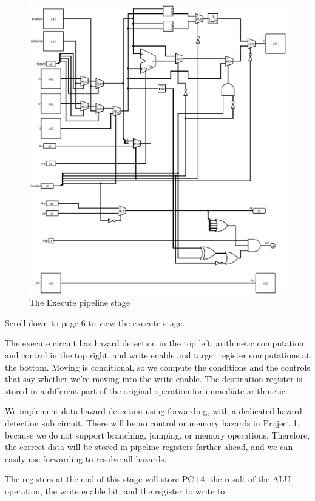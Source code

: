 \documentclass{article}
\begin{document}
\begin{figure}[h]
	\includegraphics[width = \textwidth]{execute2}
	\caption{The Execute pipeline stage}
\end{figure}

Scroll down to page $6$ to view the execute stage.

The execute circuit has hazard detection in the top left, arithmetic computation and control in the top right, and write enable and target register computations at the bottom. Moving is conditional, so we compute the conditions and the controls that say whether we're moving into the write enable. The destination register is stored in a different part of the original operation for immediate arithmetic. 

We implement data hazard detection using forwarding, with a dedicated hazard detection sub circuit. There will be no control or memory hazards in Project 1, because we do not support branching, jumping, or memory operations. Therefore, the correct data will be stored in pipeline registers farther ahead, and we can easily use forwarding to resolve all hazards. 

The registers at the end of this stage will store PC$+4$, the result of the ALU operation, the write enable bit, and the register to write to.
\end{document}

